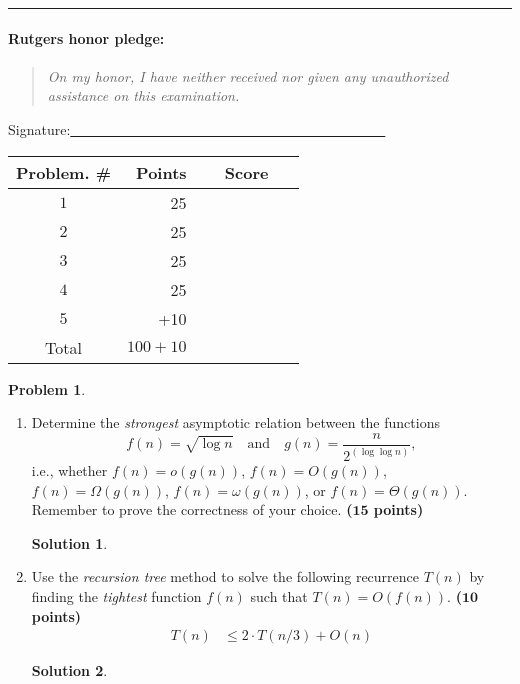 \documentclass{article}
\theoremstyle{definition}
\newtheorem{problem}{Problem}
\def\fline{\rule{0.75\linewidth}{0.5pt}}
\newcommand{\finishline}{\vspace{-15pt}\begin{center}\fline\end{center}}
\newtheorem*{solution*}{Solution}
\newenvironment{solution}{\begin{solution*}}{{} \end{solution*}}
\newcommand{\grade}[1]{\hfill{\textbf{($\mathbf{#1}$ points)}}}
\begin{document}
\finishline

\paragraph{Rutgers honor pledge:} 

\begin{quote}
\emph{On my honor, I have neither received nor given any unauthorized assistance on this
examination.} 
\end{quote}
\hfill{Signature:\underline{~~~~~~~~~~~~~~~~~~~~~~~~~~~~~~~~~~~~~~~~~~~~~}}

\bigskip

\begin{center}
\begin{tabular}{|c|r|c|}
\hline
Problem. \# & Points & Score \\ \hline\hline
$1$ & 25 & ~~~~~~~~~~~\\  \hline
$2$ & 25 & \\ \hline
$3$ & 25 & \\ \hline
$4$ & 25 & \\ \hline
$5$ & +10 & \\ \hline
Total & $100 + 10$ & \\ \hline
\end{tabular}
\end{center}

\newpage

\begin{problem}\label{basics}~
\begin{enumerate}[label=(\alph*)]
	\item  Determine the \emph{strongest} asymptotic relation between the functions 
	\[
	f(n) = \sqrt{\log{n}} \quad \text{and} \quad g(n) = \frac{n}{2^{(\log\log{n})}},
	\]
	i.e., whether $f(n) = o(g(n))$, $f(n) = O(g(n))$, $f(n) = \Omega(g(n))$, $f(n) = \omega(g(n))$, or $f(n) = \Theta(g(n))$. 
	Remember to prove the correctness of your choice. \grade{15}
\begin{solution}
\end{solution}

	\newpage
	\item Use the \emph{recursion tree} method to solve the following recurrence $T(n)$ by finding the \emph{tightest} function $f(n)$ such that $T(n) = O(f(n))$.   \grade{10}
	\begin{align*}
		T(n) &\leq 2 \cdot T(n/3) + O(n) 
	\end{align*} 
	\begin{solution}
\end{solution}
	
\end{enumerate}


\end{problem}
\end{document}
